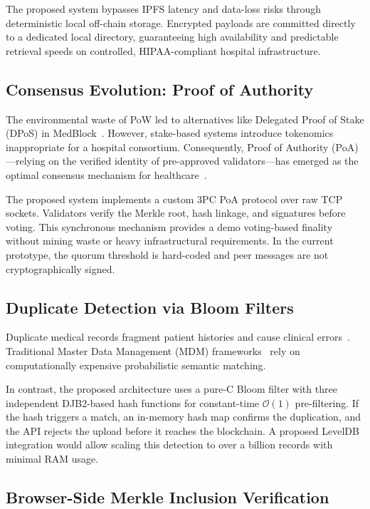 \documentclass[12pt]{article}
\begin{document}
The proposed system bypasses IPFS latency and data-loss risks through deterministic local off-chain storage. Encrypted payloads are committed directly to a dedicated local directory, guaranteeing high availability and predictable retrieval speeds on controlled, HIPAA-compliant hospital infrastructure.

\subsection{Consensus Evolution: Proof of Authority}

The environmental waste of PoW led to alternatives like Delegated Proof of Stake (DPoS) in MedBlock~\cite{47}. However, stake-based systems introduce tokenomics inappropriate for a hospital consortium. Consequently, Proof of Authority (PoA)—relying on the verified identity of pre-approved validators—has emerged as the optimal consensus mechanism for healthcare~\cite{49, 52, 53}.

The proposed system implements a custom 3PC PoA protocol over raw TCP sockets. Validators verify the Merkle root, hash linkage, and signatures before voting. This synchronous mechanism provides a demo voting-based finality without mining waste or heavy infrastructural requirements. In the current prototype, the quorum threshold is hard-coded and peer messages are not cryptographically signed.

\subsection{Duplicate Detection via Bloom Filters}

Duplicate medical records fragment patient histories and cause clinical errors~\cite{55}. Traditional Master Data Management (MDM) frameworks~\cite{57, 59} rely on computationally expensive probabilistic semantic matching. 

In contrast, the proposed architecture uses a pure-C Bloom filter with three independent DJB2-based hash functions for constant-time $\mathcal{O}(1)$ pre-filtering. If the hash triggers a match, an in-memory hash map confirms the duplication, and the API rejects the upload before it reaches the blockchain. A proposed LevelDB integration would allow scaling this detection to over a billion records with minimal RAM usage.

\subsection{Browser-Side Merkle Inclusion Verification}
\end{document}
